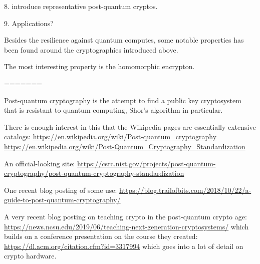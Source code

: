 8. introduce representative post-quantum cryptos.

9. Applications?

\fi




Besides the resilience against quantum computes, 
some notable properties has been found around the cryptographies
introduced above.

The most interesting property is the homomorphic encrypton.



=======






Post-quantum cryptography is the attempt to find a public key
cryptosystem that is resistant to quantum computing, Shor's algorithm
in particular.

There is enough interest in this that the Wikipedia pages are
essentially extensive catalogs:
\url{https://en.wikipedia.org/wiki/Post-quantum_cryptography}
\url{https://en.wikipedia.org/wiki/Post-Quantum_Cryptography_Standardization}

An official-looking site:
\url{https://csrc.nist.gov/projects/post-quantum-cryptography/post-quantum-cryptography-standardization}

One recent blog posting of some use:
\url{https://blog.trailofbits.com/2018/10/22/a-guide-to-post-quantum-cryptography/}

A very recent blog posting on teaching crypto in the post-quantum
crypto age:
\url{https://news.ncsu.edu/2019/06/teaching-next-generation-cryptosystems/}
which builds on a conference presentation on the course they created:
\url{https://dl.acm.org/citation.cfm?id=3317994}
which goes into a lot of detail on crypto hardware.

